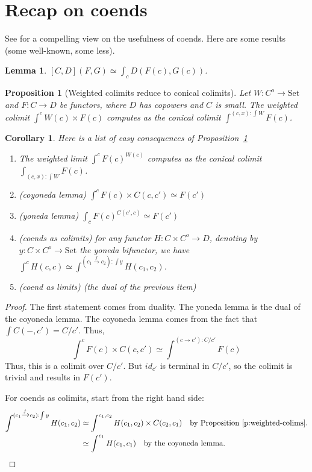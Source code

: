 \documentclass{article}
\newcommand{\Set}{\text{Set}}
\newtheorem{proposition}[theorem]{Proposition}
\newtheorem{corollary}[theorem]{Corollary}
\newtheorem{lemma}[theorem]{Lemma}
\begin{document}
\section{Recap on coends}
See \cite{coend} for a compelling view on the usefulness of coends.
Here are some results (some well-known, some less).
\begin{lemma}
 $[C,D](F,G)\simeq \int_c D(F(c),G(c))$.
\end{lemma}
\begin{proposition}[Weighted colimits reduce to conical colimits]
\label{p:weighted-colims}
  Let $W : C^o \rightarrow \Set$ and $F : C\rightarrow D$ be functors, where $D$ has copowers and
  $C$ is small.
  The weighted colimit $\int^c W(c)\times F(c)$ computes as the conical colimit
  $\int^{(c,x):\int W} F(c)$.
\end{proposition}
\begin{corollary}
\label{cor:weighted-colims}
  Here is a list of easy consequences of Proposition~\ref{p:weighted-colims}
  \begin{enumerate}
  \item The weighted limit $\int^c  F(c)^{W(c)}$ computes as the conical colimit
    $\int_{(c,x):\int W} F(c)$.
  \item (coyoneda lemma)
    $\int^c F(c)\times C(c,c')\simeq F(c')$
  \item (yoneda lemma)
    $\int_c F(c)^{C(c',c)}\simeq F(c')$
  \item (coends as colimits) for any functor $H:C\times C^o \rightarrow D$,
      denoting by $y:C \times C^o \rightarrow \Set$ the yoneda bifunctor, we
      have $\int^c H(c,c) \simeq \int^{(c_1\xrightarrow{f}{}c_2):\int y} H(c_1, c_2)$.
      \label{it-coend-colims}
  \item (coend as limits) (the dual of the previous item)
  \end{enumerate}
\end{corollary}
\begin{proof}
  The first statement comes from duality. The yoneda lemma is the dual of the
  coyoneda lemma.
  The coyoneda lemma comes from the fact that $\int C(-,c') = C/c'$. Thus,
  \[
    \int^c F(c)\times C(c,c')
    \simeq 
    \int^{(c\rightarrow c'):C/c'} F(c)
  \]
  Thus, this is a colimit over $C/c'$. But $id_{c'}$ is terminal in $C/c'$, so the
  colimit is trivial and results in $F(c')$.

  For coends as colimits, start from the right hand side:
  \begin{align*}
    \int^{(c_1\xrightarrow{f}{}c_2):\int y} H(c_1, c_2)
    & \simeq
    \int^{c_1,c_2} H(c_1, c_2)\times C(c_2,c_1)
      \text{\quad by Proposition~\ref{p:weighted-colims}.}
      \\
    & \simeq
      \int^{c_1} H(c_1, c_1)
      \text{\quad by the coyoneda lemma.}
    \end{align*}
\end{proof}
\end{document}
